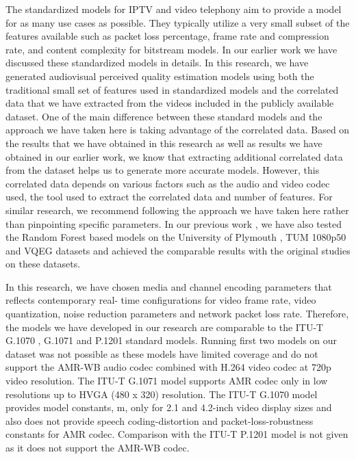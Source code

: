 \documentclass[journal]{IEEEtran}
\begin{document}
The standardized models for IPTV \cite{itut2015G.1071} \cite{itut2012P.1201} and video telephony \cite{itut2012G.1070} aim to provide a model for as many use cases as possible. They typically utilize a very small subset of the features available such as packet loss percentage, frame rate and compression rate, and content complexity for bitstream models. In our earlier work \cite{demirbilek2017parametricmodels} we have discussed these standardized models in details. In this research, we have generated audiovisual perceived quality estimation models using both the traditional small set of features used in standardized models and the correlated data that we have extracted from the videos included in the publicly available dataset. One of the main difference between these standard models and the approach we have taken here is taking advantage of the correlated data. Based on the results that we have obtained in this research as well as results we have obtained in our earlier work, we know that extracting additional correlated data from the dataset helps us to generate more accurate models. However, this correlated data depends on various factors such as the audio and video codec used, the tool used to extract the correlated data and number of features. For similar research, we recommend following the approach we have taken here rather than pinpointing specific parameters. In our previous work \cite{demirbilek2017parametricmodels}, we have also tested the Random Forest based models on the University of Plymouth \cite{goudarzi2010audiovisual}, TUM 1080p50 \cite{keimel2012tum} and VQEG datasets \cite{pinson2012influence} and achieved the comparable results with the original studies on these datasets.

In this research, we have chosen media and channel encoding parameters that reflects contemporary real- time configurations for video frame rate, video quantization, noise reduction parameters and network packet loss rate. Therefore, the models we have developed in our research are comparable to the ITU-T G.1070 \cite{itut2012G.1070}, G.1071 \cite{itut2015G.1071} and P.1201 \cite{itut2012P.1201} standard models. Running first two models on our dataset was not possible as these models have limited coverage and do not support the AMR-WB audio codec combined with H.264 video codec at 720p video resolution. The ITU-T G.1071 model supports AMR codec only in low resolutions up to HVGA (480 x 320) resolution. The ITU-T G.1070 model provides model constants, m, only for 2.1 and 4.2-inch video display sizes and also does not provide speech coding-distortion and packet-loss-robustness constants for AMR codec. Comparison with the ITU-T P.1201 model is not given as it does not support the AMR-WB codec.
\end{document}
